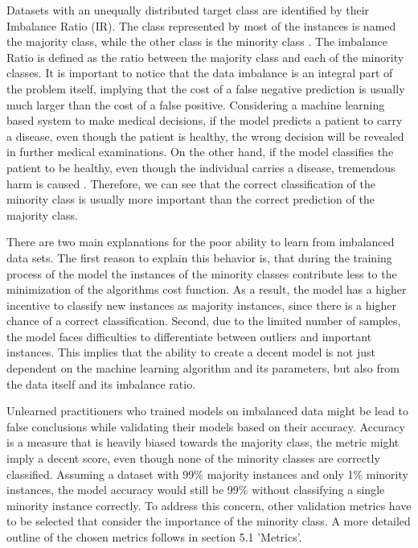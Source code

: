 \documentclass[parskip=full]{scrartcl}
\begin{document}
Datasets with an unequally distributed target class are identified by their Imbalance Ratio (IR). The class 
represented by most of the instances is named the majority class, while the other class is the minority 
class \cite{Chawla2003}. The imbalance Ratio is defined as the ratio between the majority class and each 
of the minority classes. It is important to notice that the data imbalance is an integral part of the problem 
itself, implying that the cost of a false negative prediction is usually much larger than the cost of a 
false positive. Considering a machine learning based system to make medical decisions, if the model predicts 
a patient to carry a disease, even though the patient is healthy, the wrong decision will be revealed in 
further medical examinations. On the other hand, if the model classifies the patient to be healthy, even 
though the individual carries a disease, tremendous harm is caused \cite{Wan2014LearningTI}. Therefore, 
we can see that the correct classification of the minority class is usually more important than the 
correct prediction of the majority class.

There are two main explanations for the poor ability to learn from imbalanced data sets. The first reason 
to explain this behavior is, that during the training process of the model the instances of the minority 
classes contribute less to the minimization of the algorithms cost function. As a result, the model has 
a higher incentive to classify new instances as majority instances, since there is a higher chance of a 
correct classification. Second, due to the limited number of samples, the model faces difficulties to 
differentiate between outliers and important instances. This implies that the ability to create a decent 
model is not just dependent on the machine learning algorithm and its parameters, but also from the data 
itself and its imbalance ratio.

Unlearned practitioners who trained models on imbalanced data might be lead to false conclusions while 
validating their models based on their accuracy. Accuracy is a measure that is heavily biased towards 
the majority class, the metric might imply a decent score, even though none of the minority classes are 
correctly classified. Assuming a dataset with 99\% majority instances and only 1\% minority instances, the 
model accuracy would still be 99\% without classifying a single minority instance correctly. To address 
this concern, other validation metrics have to be selected that consider the importance of the minority 
class. A more detailed outline of the chosen metrics follows in section 5.1 'Metrics'.
\end{document}
